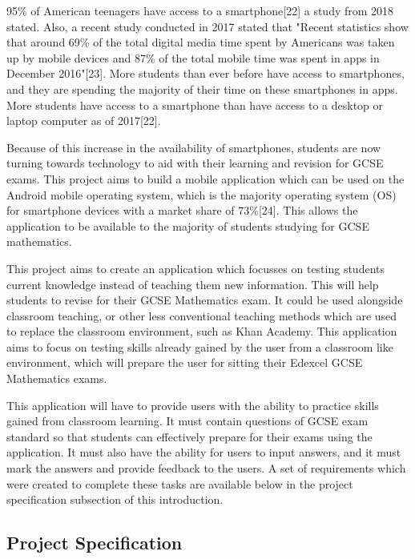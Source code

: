 \documentclass{article}
\begin{document}
95\% of American teenagers have access to a smartphone[22] a study from 2018 stated. Also, a recent study conducted in 2017 stated that "Recent statistics show that around 69\% of the total digital media time spent by Americans was taken up by mobile devices and 87\% of the total mobile time was spent in apps in December 2016"[23]. More students than ever before have access to smartphones, and they are spending the majority of their time on these smartphones in apps. More students have access to a smartphone than have access to a desktop or laptop computer as of 2017[22]. \par

Because of this increase in the availability of smartphones, students are now turning towards technology to aid with their learning and revision for GCSE exams. This project aims to build a mobile application which can be used on the Android mobile operating system, which is the majority operating system (OS) for smartphone devices with a market share of 73\%[24]. This allows the application to be available to the majority of students studying for GCSE mathematics. \par

This project aims to create an application which focusses on testing students current knowledge instead of teaching them new information. This will help students to revise for their GCSE Mathematics exam. It could be used alongside classroom teaching, or other less conventional teaching methods which are used to replace the classroom environment, such as Khan Academy. This application aims to focus on testing skills already gained by the user from a classroom like environment, which will prepare the user for sitting their Edexcel GCSE Mathematics exams. \par

This application will have to provide users with the ability to practice skills gained from classroom learning. It must contain questions of GCSE exam standard so that students can effectively prepare for their exams using the application. It must also have the ability for users to input answers, and it must mark the answers and provide feedback to the users. A set of requirements which were created to complete these tasks are available below in the project specification subsection of this introduction. \par

\subsection{Project Specification}
\end{document}
